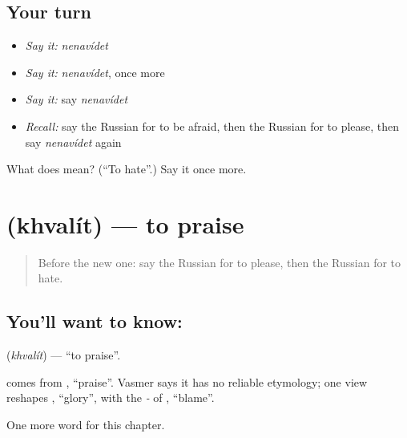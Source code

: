 \subsection*{Your turn}
\begin{itemize}
\raggedright
  \item \emph{Say it:} \emph{nenavídet}
  \item \emph{Say it:} \emph{nenavídet}, once more
  \item \emph{Say it:} say \emph{nenavídet}
  \item \emph{Recall:} say the Russian for to be afraid, then the Russian for to please, then say \emph{nenavídet} again
\end{itemize}

\begin{tcolorbox}[breakable,colback=teal!4,colframe=teal!35!black,title={Before you move on}]
What does  mean? (\textquotedblleft{}To hate\textquotedblright{}.) Say it once more.
\end{tcolorbox}
\section[\texorpdfstring{\ru{хвалить} (khvalít)}{хвалить (khvalít)}]{ (khvalít) — to praise}

\label{lesson:RU-C144-khvalit}



\begin{quote}
Before the new one: say the Russian for to please, then the Russian for to hate.
\end{quote}

\subsection*{You'll want to know: }
\textbf{} (\emph{khvalít}) — \textquotedblleft{}to praise\textquotedblright{}.

\begin{cousinweb}
\textbf{} comes from \emph{}, \textquotedblleft{}praise\textquotedblright{}. Vasmer says it has no reliable etymology; one view reshapes \emph{}, \textquotedblleft{}glory\textquotedblright{}, with the \emph{-} of \emph{}, \textquotedblleft{}blame\textquotedblright{}.
\end{cousinweb}

\begin{grammarlens}[title={What you've built}]
One more word for this chapter.
\end{grammarlens}


